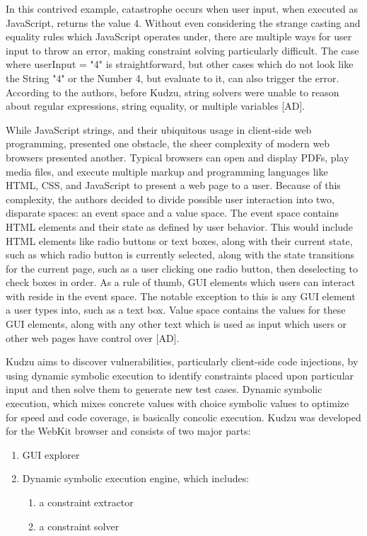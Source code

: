 \documentclass[11pt,expanded,copyright]{fsuthesis}
\begin{document}
In this contrived example, catastrophe occurs when user input, when executed as JavaScript, returns the value 4. Without even considering the strange casting and equality rules which JavaScript operates under, there are multiple ways for user input to throw an error, making constraint solving particularly difficult. The case where userInput = "4" is straightforward, but other cases which do not look like the String "4" or the Number 4, but evaluate to it, can also trigger the error. According to the authors, before Kudzu, string solvers were unable to reason about regular expressions, string equality, or multiple variables [AD].

While JavaScript strings, and their ubiquitous usage in client-side web programming, presented one obstacle, the sheer complexity of modern web browsers presented another. Typical browsers can open and display PDFs, play media files, and execute multiple markup and programming languages like HTML, CSS, and JavaScript to present a web page to a user. Because of this complexity, the authors decided to divide possible user interaction into two, disparate spaces: an event space and a value space. The event space contains HTML elements and their state as defined by user behavior. This would include HTML elements like radio buttons or text boxes, along with their current state, such as which radio button is currently selected, along with the state transitions for the current page, such as a user clicking one radio button, then deselecting to check boxes in order. As a rule of thumb, GUI elements which users can interact with reside in the event space. The notable exception to this is any GUI element a user types into, such as a text box. Value space contains the values for these GUI elements, along with any other text which is used as input which users or other web pages have control over [AD].

Kudzu aims to discover vulnerabilities, particularly client-side code injections, by using dynamic symbolic execution to identify constraints placed upon particular input and then solve them to generate new test cases. Dynamic symbolic execution, which mixes concrete values with choice symbolic values to optimize for speed and code coverage, is basically concolic execution. Kudzu was developed for the WebKit browser and consists of two major parts:
\begin{enumerate}
	\item GUI explorer
	\item Dynamic symbolic execution engine, which includes:
	\begin{enumerate}
		\item a constraint extractor
		\item a constraint solver
	\end{enumerate}
\end{enumerate}
\end{document}
